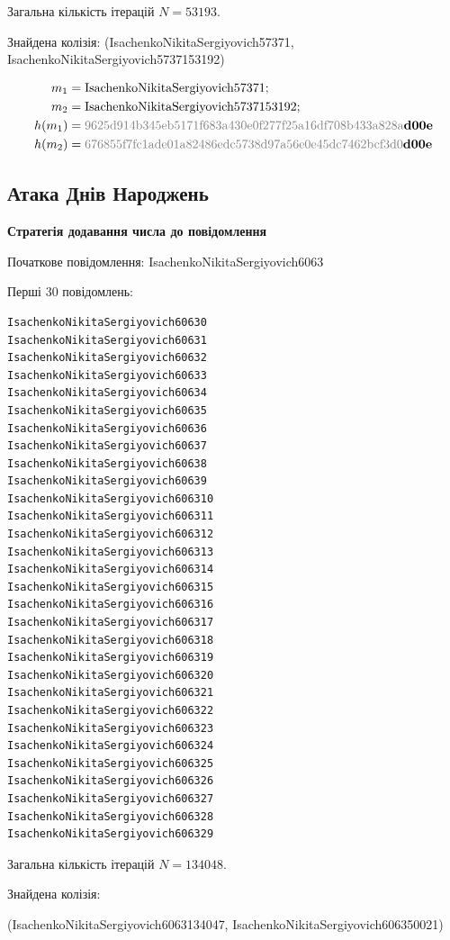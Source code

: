 \documentclass[12pt]{article}
\begin{document}
Загальна кількість ітерацій $N = 53193$.

Знайдена колізія: (IsachenkoNikitaSergiyovich57371, IsachenkoNikitaSergiyovich5737153192)

\begin{align*}
m_1 &= \text{IsachenkoNikitaSergiyovich57371}; \\
m_2 &= \text{IsachenkoNikitaSergiyovich5737153192}; \\
h(m_1) &= \textcolor{codegray}{\text{9625d914b345eb5171f683a430e0f277f25a16df708b433a828a}}\text{\textbf{d00e}} \\
h(m_2) &= \textcolor{codegray}{\text{676855f7fc1ade01a82486edc5738d97a56e0e45dc7462bcf3d0}}\text{\textbf{d00e}}
\end{align*}

\subsection{Атака Днів Народжень}

\textbf{Стратегія додавання числа до повідомлення}

\noindent
Початкове повідомлення: IsachenkoNikitaSergiyovich6063

\noindent
Перші 30 повідомлень:
\begin{verbatim}
IsachenkoNikitaSergiyovich60630
IsachenkoNikitaSergiyovich60631
IsachenkoNikitaSergiyovich60632
IsachenkoNikitaSergiyovich60633
IsachenkoNikitaSergiyovich60634
IsachenkoNikitaSergiyovich60635
IsachenkoNikitaSergiyovich60636
IsachenkoNikitaSergiyovich60637
IsachenkoNikitaSergiyovich60638
IsachenkoNikitaSergiyovich60639
IsachenkoNikitaSergiyovich606310
IsachenkoNikitaSergiyovich606311
IsachenkoNikitaSergiyovich606312
IsachenkoNikitaSergiyovich606313
IsachenkoNikitaSergiyovich606314
IsachenkoNikitaSergiyovich606315
IsachenkoNikitaSergiyovich606316
IsachenkoNikitaSergiyovich606317
IsachenkoNikitaSergiyovich606318
IsachenkoNikitaSergiyovich606319
IsachenkoNikitaSergiyovich606320
IsachenkoNikitaSergiyovich606321
IsachenkoNikitaSergiyovich606322
IsachenkoNikitaSergiyovich606323
IsachenkoNikitaSergiyovich606324
IsachenkoNikitaSergiyovich606325
IsachenkoNikitaSergiyovich606326
IsachenkoNikitaSergiyovich606327
IsachenkoNikitaSergiyovich606328
IsachenkoNikitaSergiyovich606329
\end{verbatim}

Загальна кількість ітерацій $N = 134048$.

Знайдена колізія:

(IsachenkoNikitaSergiyovich6063134047, IsachenkoNikitaSergiyovich606350021)
\end{document}
